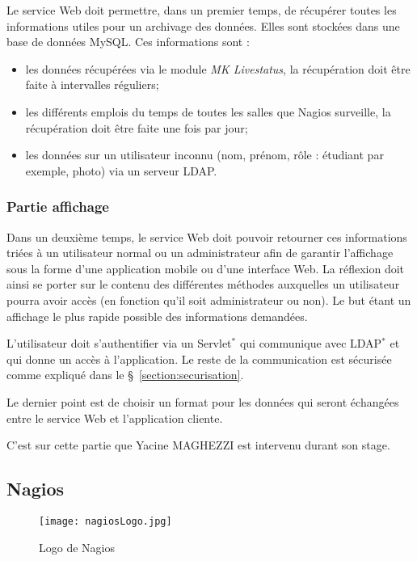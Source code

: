 Le service Web doit permettre, dans un premier temps, de r\'ecup\'erer toutes les informations utiles pour un archivage des donn\'ees.
Elles sont stock\'ees dans une base de donn\'ees MySQL.
\noindent Ces informations sont :

\begin{itemize}
	\item les donn\'ees r\'ecup\'er\'ees via le module \textit{MK Livestatus}, la r\'ecup\'eration doit \^etre faite \`a intervalles r\'eguliers;
	\item les diff\'erents emplois du temps de toutes les salles que Nagios surveille, la r\'ecup\'eration doit \^etre faite une fois par jour;
	\item les donn\'ees sur un utilisateur inconnu (nom, pr\'enom, r\^ole : \'etudiant par exemple, photo) via un serveur LDAP.

\end{itemize}

\subsubsection{Partie affichage}

Dans un deuxi\`eme temps, le service Web doit pouvoir retourner ces informations tri\'ees \`a un utilisateur normal ou un administrateur afin de garantir l'affichage sous la forme d'une application mobile ou d'une interface Web.
La r\'eflexion doit ainsi se porter sur le contenu des diff\'erentes m\'ethodes auxquelles un utilisateur pourra avoir acc\`es (en fonction qu'il soit administrateur ou non).
Le but \'etant un affichage le plus rapide possible des informations demand\'ees.

L'utilisateur doit s'authentifier via un Servlet$^*$ qui communique avec LDAP$^*$ et qui donne un acc\`es \`a l'application.
Le reste de la communication est s\'ecuris\'ee comme expliqu\'e dans le \S~\ref{section:securisation}.

Le dernier point est de choisir un format pour les donn\'ees qui seront \'echang\'ees entre le service Web et l'application cliente.

C'est sur cette partie que Yacine MAGHEZZI est intervenu durant son stage.

\subsection{Nagios}
\label{section:nagios}

\begin{figure}[!ht]
	\centering
	\texttt{[image: nagiosLogo.jpg]}
	\caption{Logo de Nagios}

\end{figure}

